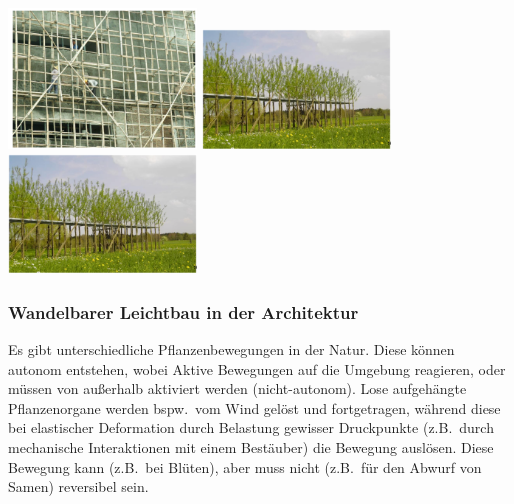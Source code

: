 \begin{center}
    \includegraphics[width=5cm]{lec7/figures/bambus.png}
    \hfill
    \includegraphics[width=5cm]{lec7/figures/steg1.png}
    \hfill
    \includegraphics[width=5cm]{lec7/figures/steg1.png}
\end{center}

\subsubsection{Wandelbarer Leichtbau in der Architektur}

Es gibt unterschiedliche Pflanzenbewegungen in der Natur. Diese können autonom entstehen, wobei Aktive Bewegungen auf die Umgebung reagieren, oder müssen von außerhalb aktiviert werden (nicht-autonom). Lose aufgehängte Pflanzenorgane werden bspw.\ vom Wind gelöst und fortgetragen, während diese bei elastischer Deformation durch Belastung gewisser Druckpunkte (z.B.\ durch mechanische Interaktionen mit einem Bestäuber) die Bewegung auslösen. Diese Bewegung kann (z.B.\ bei Blüten), aber muss nicht (z.B.\ für den Abwurf von Samen) reversibel sein.

